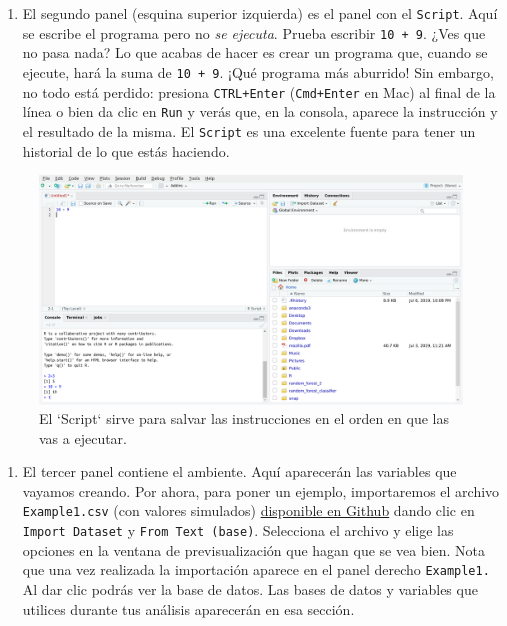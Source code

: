\documentclass[
]{book}
\providecommand{\tightlist}{%
  \setlength{\itemsep}{0pt}\setlength{\parskip}{0pt}}
\begin{document}
\begin{enumerate}
\def\labelenumi{\arabic{enumi}.}
\setcounter{enumi}{1}
\tightlist
\item
  El segundo panel (esquina superior izquierda) es el panel con el \texttt{Script}. Aquí se escribe el programa pero no \emph{se ejecuta}. Prueba escribir \texttt{10\ +\ 9}. ¿Ves que no pasa nada? Lo que acabas de hacer es crear un programa que, cuando se ejecute, hará la suma de \texttt{10\ +\ 9}. ¡Qué programa más aburrido! Sin embargo, no todo está perdido: presiona \texttt{CTRL+Enter} (\texttt{Cmd+Enter} en Mac) al final de la línea o bien da clic en \texttt{Run} y verás que, en la consola, aparece la instrucción y el resultado de la misma. El \texttt{Script} es una excelente fuente para tener un historial de lo que estás haciendo.
\end{enumerate}

\begin{figure}

{\centering \includegraphics[width=40in]{images/RStudio5} 

}

\caption{El `Script` sirve para salvar las instrucciones en el orden en que las vas a ejecutar.}\label{fig:unnamed-chunk-220}
\end{figure}

\begin{enumerate}
\def\labelenumi{\arabic{enumi}.}
\setcounter{enumi}{2}
\tightlist
\item
  El tercer panel contiene el ambiente. Aquí aparecerán las variables que vayamos creando. Por ahora, para poner un ejemplo, importaremos el archivo \texttt{Example1.csv} (con valores simulados) \href{https://github.com/RodrigoZepeda/LibroEstadistica/tree/master/datasets}{disponible en Github} dando clic en \texttt{Import\ Dataset} y \texttt{From\ Text\ (base)}. Selecciona el archivo y elige las opciones en la ventana de previsualización que hagan que se vea bien. Nota que una vez realizada la importación aparece en el panel derecho \texttt{Example1.} Al dar clic podrás ver la base de datos. Las bases de datos y variables que utilices durante tus análisis aparecerán en esa sección.
\end{enumerate}
\end{document}
